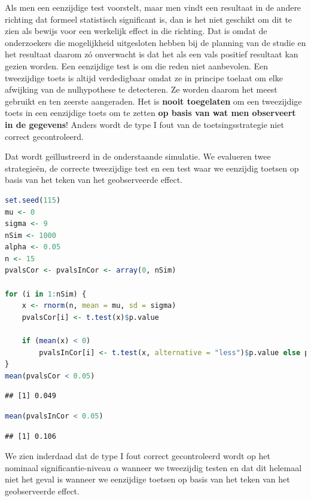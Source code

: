 \documentclass[
  12pt,dutch,coursenotes]{book}
\theoremstyle{definition}
\theoremstyle{definition}
\theoremstyle{definition}
\theoremstyle{definition}
\theoremstyle{remark}
\begin{document}
Als men een eenzijdige test voorstelt, maar men
vindt een resultaat in de andere richting
dat formeel statistisch significant is, dan is het niet geschikt om dit te
zien als bewijs voor een werkelijk effect in die richting. Dat is omdat de
onderzoekers die mogelijkheid uitgesloten hebben bij de planning van de
studie en het resultaat daarom zó onverwacht is dat het als een vals
positief resultaat kan gezien worden. Een eenzijdige test is om die reden
niet aanbevolen. Een tweezijdige toets is altijd verdedigbaar omdat ze in principe toelaat om elke afwijking van de nulhypothese te detecteren. Ze worden daarom het meest gebruikt en ten zeerste aangeraden.
Het is \textbf{nooit toegelaten} om een tweezijdige toets in een eenzijdige
toets om te zetten \textbf{op basis van wat men observeert in de gegevens}!
Anders wordt de type I fout van de toetsingsstrategie niet correct gecontroleerd.

Dat wordt geïllustreerd in de onderstaande simulatie.
We evalueren twee strategieën, de correcte tweezijdige test en een test waar we eenzijdig toetsen op basis van het teken van het geobserveerde effect.

\begin{lstlisting}[language=R]
set.seed(115)
mu <- 0
sigma <- 9
nSim <- 1000
alpha <- 0.05
n <- 15
pvalsCor <- pvalsInCor <- array(0, nSim)

for (i in 1:nSim) {
    x <- rnorm(n, mean = mu, sd = sigma)
    pvalsCor[i] <- t.test(x)$p.value

    if (mean(x) < 0)
        pvalsInCor[i] <- t.test(x, alternative = "less")$p.value else pvalsInCor[i] <- t.test(x, alternative = "greater")$p.value
}
mean(pvalsCor < 0.05)
\end{lstlisting}

\begin{lstlisting}
## [1] 0.049
\end{lstlisting}

\begin{lstlisting}[language=R]
mean(pvalsInCor < 0.05)
\end{lstlisting}

\begin{lstlisting}
## [1] 0.106
\end{lstlisting}

We zien inderdaad dat de type I fout correct gecontroleerd wordt op het nominaal significantie-niveau \(\alpha\) wanneer we tweezijdig testen en dat dit helemaal niet het geval is wanneer we eenzijdige toetsen op basis van het teken van het geobserveerde effect.
\end{document}

